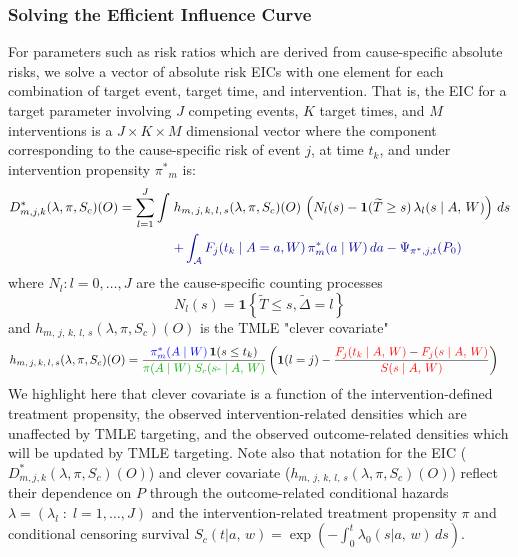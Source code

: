 \documentclass{report}
\newcommand{\1}{\ensuremath{\mathbf{1}}}
\newcommand{\T}{\ensuremath{\widetilde{T}}}
\newcommand{\X}{\ensuremath{{W}}}
\newcommand{\ax}{\ensuremath{\mid a,\,{w}}}
\newcommand{\AX}{\ensuremath{\mid A,\,{W}}}
\newcommand{\trt}{\ensuremath{\pi^*}}
\newcommand{\lj}{\ensuremath{l}}
\newcommand{\jj}{\ensuremath{j}}
\newcommand{\g}{\ensuremath{\pi}}
\newcommand{\tDelta}{\ensuremath{\widetilde{\Delta}}}
\begin{document}
\subsubsection{Solving the Efficient Influence Curve}
\label{EIC}
For parameters such as risk ratios which are derived from cause-specific absolute risks, we solve a vector of absolute risk EICs with one element for each combination of target event, target time, and intervention. That is, the EIC for a target parameter involving \(J\) competing events, \(K\) target times, and \(M\) interventions is a \(J \times K\times M\) dimensional vector where the component corresponding to the cause-specific risk of event \(\jj\), at time \(t_k\), and under intervention propensity \(\trt_{m}\) is:
\begin{align}
    D^*_{m, \jj, k}(\lambda, \g, S_c)(O) = \sum_{\lj = 1}^{J} \int \; &h_{m,\, \jj,\, k,\, \lj,\, s}(\lambda, \g, S_c)(O) \, \left(N_{\lj}(s) - \1(\T \geq s) \, \lambda_\lj(s \AX)\right) \, ds \label{eic} \\
    &{\color{blue!60!black}+ \int_{\mathcal{A}} F_\jj(t_k \mid A = a, \X)\,\trt_m(a \mid \X) \, da - \Psi_{\trt, \jj, t}(P_0)}  \nonumber 
\end{align}
where \(N_l : l = 0,\dots, J\) are the cause-specific counting processes
\[N_l(s) = \1\left\{\T \leq s, \tDelta = l\right\} \]
and \(h_{m,\, \jj,\, k,\, \lj,\, s}(\lambda, \g, S_c)(O)\) is the TMLE "clever covariate"
\begin{align}
    h_{m,\, \jj,\, k,\, \lj,\, s}&(\lambda, \g, S_c)(O) = \frac{{\color{blue}\trt_m(A \mid \X)\,} \1(s \leq t_k)}{{\color{green!70!black}\g(A \mid \X) \;S_c(s\text{-} \AX)}} \, \bigg(\1(\lj = \jj) - \frac{{\color{red}F_\jj(t_k \AX)} - {\color{red} F_\jj(s \AX)}}{{\color{red} S(s \AX)}}\bigg) \label{clevcov}
\end{align}
We highlight here that clever covariate is a function of the {\color{blue}intervention-defined treatment propensity}, the {\color{green!70!black}observed intervention-related densities} which are unaffected by TMLE targeting, and the {\color{red}observed outcome-related densities} which will be updated by TMLE targeting. Note also that notation for the EIC (\(D^*_{m, \jj, k}(\lambda, \g, S_c)(O)\)) and clever covariate (\(h_{m,\, \jj,\, k,\, \lj,\, s}(\lambda, \g, S_c)(O)\)) reflect their dependence on \(P\) through the outcome-related conditional hazards \(\lambda = (\lambda_l \;:\;  l = 1, \dots, J)\) and the intervention-related treatment propensity \(\g\) and conditional censoring survival \(S_c(t \ax) = \exp\left(-\int^{t}_{0} \lambda_0(s \ax) \, ds \right)\).
\end{document}
